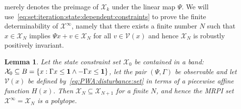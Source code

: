 \documentclass[letterpaper, 10pt, conference]{ieeeconf} %
\newtheorem{thm}{Lemma}[section]
\begin{document}
merely denotes the preimage of $\mathcal X_k$ under the linear map $\Psi$.
We will use~\eqref{eq:set:iteration:state:dependent:constraints} to prove the finite determinability of
$\mathcal X^\infty$, namely that there exists a finite number $N$ such that $x\in\mathcal X_N$ implies
$\Psi x + v \in\mathcal X_N$ for all $v\in\mathcal V(x)$ and hence $\mathcal X_N$ is robustly positively invariant.
%
\begin{thm}\label{thm:finite:MRPI:set:state:dependable}
Let the state constraint set $\mathcal X_0$ be contained in a band: $\mathcal X_0\subseteq B=\{x:\Gamma x\leq{\bf{1}}\wedge 
-\Gamma x\leq{\bf{1}}\}$, let the pair $(\Psi,\Gamma)$ be observable and let $\mathcal V(x)$ be defined 
by~\eqref{eq:PWA:disturbance:set} in terms of a piecewise affine function $H(x)$. Then $\mathcal X_N\subseteq \mathcal 
X_{N+1}$ for a finite $N$, and hence the MRPI set $\mathcal X^\infty =\mathcal X_N$ is a polytope.
\end{thm}
%
\end{document}

